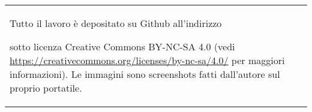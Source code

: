 
~\vfill
\begin{center}
\begin{tabular}{p{}}
Tutto il lavoro è depositato su {\sf Github} all'indirizzo
\begin{center}
\url{}
\end{center}
sotto licenza {\sf Creative Commons BY-NC-SA 4.0} (vedi \url{https://creativecommons.org/licenses/by-nc-sa/4.0/}
per maggiori informazioni). Le immagini sono screenshots fatti dall'autore sul proprio portatile.
\end{tabular}
\end{center}